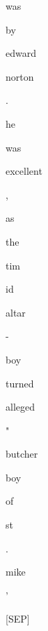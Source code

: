 \documentclass[varwidth=150mm]{standalone}
\begin{document}
\begin{CJK*}{UTF8}{gbsn}
{{{\colorbox{red!0.0}{\strut was} \colorbox{red!2.9563724994659424}{\strut by} \colorbox{red!2.080353021621704}{\strut edward} \colorbox{red!25.1059627532959}{\strut norton} \colorbox{red!0.0}{\strut .} \colorbox{red!1.4242525100708008}{\strut he} \colorbox{red!1.81672203540802}{\strut was} \colorbox{red!2.298417329788208}{\strut excellent} \colorbox{red!2.378305196762085}{\strut ,} \colorbox{red!4.0883307456970215}{\strut as} \colorbox{red!5.5796027183532715}{\strut the} \colorbox{red!0.0}{\strut tim}\colorbox{red!0.0}{\strut id} \colorbox{red!6.082896709442139}{\strut altar} \colorbox{red!6.557377338409424}{\strut -} \colorbox{red!0.0}{\strut boy} \colorbox{red!11.930208206176758}{\strut turned} \colorbox{red!1.0981602668762207}{\strut alleged} \colorbox{red!3.1298680305480957}{\strut "} \colorbox{red!1.3809484243392944}{\strut butcher} \colorbox{red!0.0}{\strut boy} \colorbox{red!2.560235023498535}{\strut of} \colorbox{red!3.396387815475464}{\strut st} \colorbox{red!1.142430067062378}{\strut .} \colorbox{red!0.0}{\strut mike} \colorbox{red!35.44267272949219}{\strut '} \colorbox{red!16.466630935668945}{\strut [SEP]}
}}}
\end{CJK*}
\end{document}
